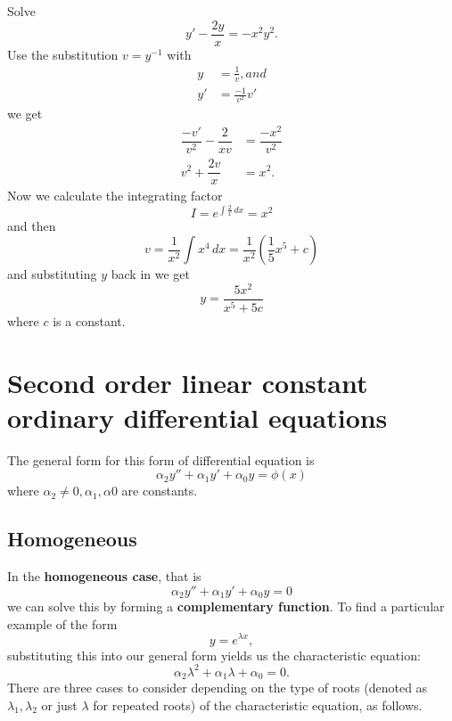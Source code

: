 \begin{example}
    Solve \[y'-\dfrac{2y}{x}=-x^2y^2.\]
    Use the substitution $v=y^{-1}$ with
    \begin{align*}
        y&=\frac1v, and\\
        y'&=\frac{-1}{v^2}v'
    \end{align*}
    we get
    \begin{align*}
        \dfrac{-v'}{v^2}-\dfrac{2}{xv}&=\dfrac{-x^2}{v^2}\\
        v^2+\dfrac{2v}{x}&=x^2.
    \end{align*}
    Now we calculate the integrating factor \[I=e^{\int\frac2x\,dx}=x^2\]
    and then
    \[v=\dfrac1{x^2}\int x^4\,dx=\dfrac1{x^2}\left(\frac15x^5+c\right)\]
    and substituting $y$ back in we get \[y=\dfrac{5x^2}{x^5+5c}\] where $c$ is a constant.
\end{example}

\section{Second order linear constant ordinary differential equations}

The general form for this form of differential equation is \[\alpha_2y''+\alpha_1y'+\alpha_0y=\phi(x)\] where $\alpha_2\neq0,\alpha_1,\alpha0$ are constants. 

\subsection{Homogeneous}

In the \textbf{homogeneous case}, that is \[\alpha_2y''+\alpha_1y'+\alpha_0y=0\] we can solve this by forming a \textbf{complementary function}. To find a particular example of the form \[y=e^{\lambda x},\] substituting this into our general form yields us the characteristic equation: \[\alpha_2\lambda^2+\alpha_1\lambda+\alpha_0=0.\] There are three cases to consider depending on the type of roots (denoted as $\lambda_1,\lambda_2$ or just $\lambda$ for repeated roots) of the characteristic equation, as follows.

